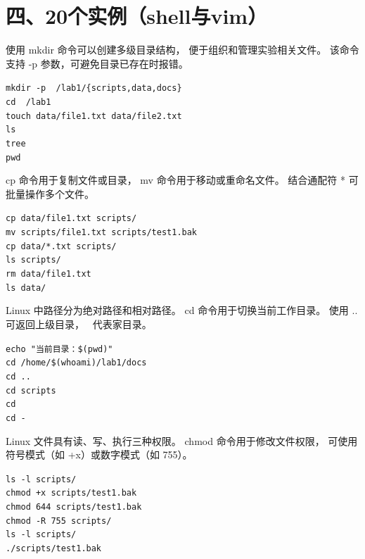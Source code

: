 \documentclass[a4paper, 12pt]{article}
\begin{document}
\section*{四、20个实例（shell与vim）}

\begin{tcolorbox}[instancestyle, title=实例1：创建实验目录结构]
使用 mkdir 命令可以创建多级目录结构，
便于组织和管理实验相关文件。
该命令支持 -p 参数，可避免目录已存在时报错。

\texttt{mkdir -p ~/lab1/\{scripts,data,docs\}} \\
\texttt{cd ~/lab1} \\
\texttt{touch data/file1.txt data/file2.txt} \\
\texttt{ls} \\
\texttt{tree} \\
\texttt{pwd}
\end{tcolorbox}

\begin{tcolorbox}[instancestyle, title=实例2：文件复制与重命名]
cp 命令用于复制文件或目录，
mv 命令用于移动或重命名文件。
结合通配符 * 可批量操作多个文件。

\texttt{cp data/file1.txt scripts/} \\
\texttt{mv scripts/file1.txt scripts/test1.bak} \\
\texttt{cp data/*.txt scripts/} \\
\texttt{ls scripts/} \\
\texttt{rm data/file1.txt} \\
\texttt{ls data/}
\end{tcolorbox}

\begin{tcolorbox}[instancestyle, title=实例3：切换目录与路径使用]
Linux 中路径分为绝对路径和相对路径。
cd 命令用于切换当前工作目录。
使用 .. 可返回上级目录，~ 代表家目录。

\texttt{echo "当前目录：\$(pwd)"} \\
\texttt{cd /home/\$(whoami)/lab1/docs} \\
\texttt{cd ..} \\
\texttt{cd scripts} \\
\texttt{cd ~} \\
\texttt{cd -}
\end{tcolorbox}

\begin{tcolorbox}[instancestyle, title=实例4：查看与修改文件权限]
Linux 文件具有读、写、执行三种权限。
chmod 命令用于修改文件权限，
可使用符号模式（如 +x）或数字模式（如 755）。

\texttt{ls -l scripts/} \\
\texttt{chmod +x scripts/test1.bak} \\
\texttt{chmod 644 scripts/test1.bak} \\
\texttt{chmod -R 755 scripts/} \\
\texttt{ls -l scripts/} \\
\texttt{./scripts/test1.bak}
\end{tcolorbox}
\end{document}
